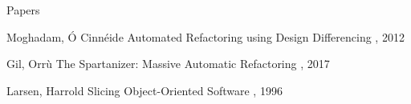 \documentclass{beamer}
\begin{document}
\begin{frame}{Papers}
  \begin{thebibliography}{10}
    \beamertemplatearticlebibitems
    
      Moghadam, Ó Cinnéide
      \newblock Automated Refactoring using Design Differencing
      , 2012
    
      Gil, Orrù
      \newblock The Spartanizer: Massive Automatic Refactoring
      , 2017
    
      Larsen, Harrold
      \newblock Slicing Object-Oriented Software
      , 1996
  \end{thebibliography}
\end{frame}
\end{document}
